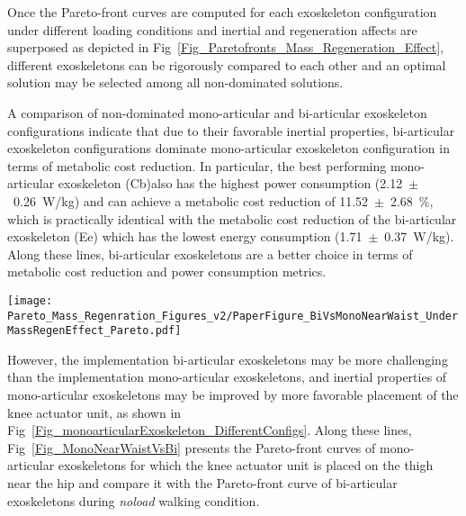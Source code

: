 \documentclass[10pt,letterpaper]{article}
\begin{document}
Once the Pareto-front curves are computed for each exoskeleton configuration under different loading conditions and inertial and regeneration affects are superposed as depicted in Fig~\ref{Fig_Paretofronts_Mass_Regeneration_Effect}, different exoskeletons can be rigorously compared to each other and an optimal solution may be selected among all non-dominated solutions.

A comparison of non-dominated  mono-articular and bi-articular exoskeleton configurations indicate that due to their favorable inertial properties, bi-articular exoskeleton configurations dominate mono-articular exoskeleton configuration in terms of metabolic cost reduction. In particular, the best performing mono-articular exoskeleton (Cb)also has the highest power consumption (2.12~$\pm$~0.26~W/kg) and can achieve a metabolic cost reduction of 11.52~$\pm$~2.68~\%, which is practically identical with the metabolic cost reduction of the bi-articular exoskeleton (Ee) which has the lowest energy consumption (1.71~$\pm$~0.37~W/kg). Along these lines, bi-articular exoskeletons are a better choice in terms of metabolic cost reduction and power consumption metrics.

\begin{figure*}[ht]
	\centering
	\texttt{[image: Pareto\_Mass\_Regenration\_Figures\_v2/PaperFigure\_BiVsMonoNearWaist\_UnderMassRegenEffect\_Pareto.pdf]}
	\caption{{\small\textbf{Comparison of Pareto-fronts of the mono-articular exoskeletons with knee actuator near waist to bi-articular exoskeletons.} Pareto-front curves of the mono-articular and bi-articular exoskeletons during \emph{noload} walking condition under ideal conditions and comparison of the Pareto-front curves of the mono-articular exoskeleton with knee actuator near the waist and bi-articular exoskeletons during \emph{noload} walking condition under the effect of mass/inertia and regeneration with 65\% efficiency.}} \vspace{-\baselineskip}
	\label{Fig_MonoNearWaistVsBi}
\end{figure*}

However, the implementation bi-articular exoskeletons may be more challenging than the implementation mono-articular exoskeletons, and inertial properties of mono-articular exoskeletons may be improved by more favorable placement of the knee actuator unit, as shown in Fig~\ref{Fig_monoarticularExoskeleton_DifferentConfigs}. Along these lines, Fig~\ref{Fig_MonoNearWaistVsBi} presents the Pareto-front curves of mono-articular exoskeletons for which the knee actuator unit is placed on the thigh near the hip and compare it with the Pareto-front curve of bi-articular exoskeletons during \emph{noload} walking condition.
\end{document}
